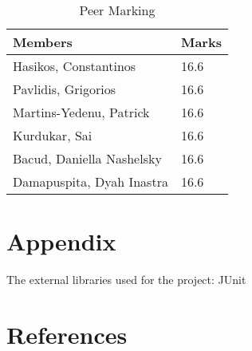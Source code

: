 \documentclass{article}
\begin{document}
\begin{table}[h]
	\centering
    \begin{tabular}{|l|l|}
    \hline
    \textbf{Members}                   & \textbf{Marks} \\ \hline
    Hasikos, Constantinos     & 16.6  \\ \hline
    Pavlidis, Grigorios       & 16.6  \\ \hline
    Martins-Yedenu, Patrick   & 16.6  \\ \hline
    Kurdukar, Sai             & 16.6  \\ \hline
    Bacud, Daniella Nashelsky & 16.6  \\ \hline
    Damapuspita, Dyah Inastra & 16.6  \\ \hline
    \end{tabular}
    \caption {Peer Marking}
\end{table}

	\section{Appendix}
		The external libraries used for the project:  
		JUnit
	\section{References}	
\end{document}
